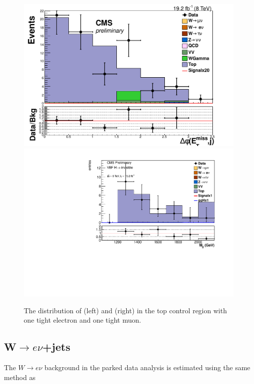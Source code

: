 \begin{figure}
  \includegraphics[width=.6\largefigwidth]{plots/parked/topjetmetdphicut0.pdf}
  \includegraphics[width=.6\largefigwidth]{plots/parked/AN-14-243-figs/output_sigreg/top_dijet_M.pdf}
  \caption{The distribution of \jetmetdphi (left) and \Mjj (right) in the top control region with one tight electron and one tight muon.}
  \label{fig:parkedtopjetmetdphi}
\end{figure}

\subsection{W$\rightarrow e\nu$+jets}%
\label{sec:parkedwenu}
The $W\rightarrow e\nu$ background in the parked data analysis is estimated using the same method as 

